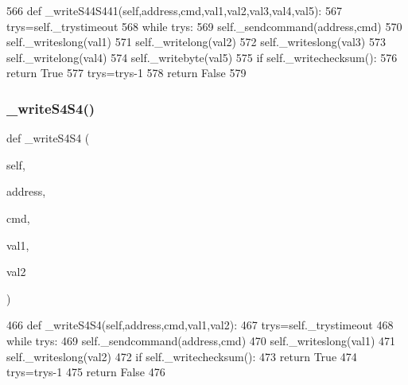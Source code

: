 \begin{DoxyCode}
566     \textcolor{keyword}{def }\_writeS44S441(self,address,cmd,val1,val2,val3,val4,val5):
567         trys=self.\_trystimeout
568         \textcolor{keywordflow}{while} trys:
569             self.\_sendcommand(address,cmd)
570             self.\_writeslong(val1)
571             self.\_writelong(val2)
572             self.\_writeslong(val3)
573             self.\_writelong(val4)
574             self.\_writebyte(val5)
575             \textcolor{keywordflow}{if} self.\_writechecksum():
576                 \textcolor{keywordflow}{return} \textcolor{keyword}{True}
577             trys=trys-1
578         \textcolor{keywordflow}{return} \textcolor{keyword}{False}
579 
\end{DoxyCode}
\mbox{\label{classtoxic__hardware_1_1roboclaw__3_1_1Roboclaw_a68c18336b966db584c4af7ca9a7270c5}} 
\subsubsection{\texorpdfstring{\+\_\+write\+S4\+S4()}{\_writeS4S4()}}
{\footnotesize\ttfamily def \+\_\+write\+S4\+S4 (\begin{DoxyParamCaption}\item[{}]{self,  }\item[{}]{address,  }\item[{}]{cmd,  }\item[{}]{val1,  }\item[{}]{val2 }\end{DoxyParamCaption})\hspace{0.3cm}{\ttfamily [private]}}


\begin{DoxyCode}
466     \textcolor{keyword}{def }\_writeS4S4(self,address,cmd,val1,val2):
467         trys=self.\_trystimeout
468         \textcolor{keywordflow}{while} trys:
469             self.\_sendcommand(address,cmd)
470             self.\_writeslong(val1)
471             self.\_writeslong(val2)
472             \textcolor{keywordflow}{if} self.\_writechecksum():
473                 \textcolor{keywordflow}{return} \textcolor{keyword}{True}
474             trys=trys-1
475         \textcolor{keywordflow}{return} \textcolor{keyword}{False}
476 
\end{DoxyCode}
\mbox{\label{classtoxic__hardware_1_1roboclaw__3_1_1Roboclaw_a45ce0518a91d2d3c7bcf75353f0f2362}} 
